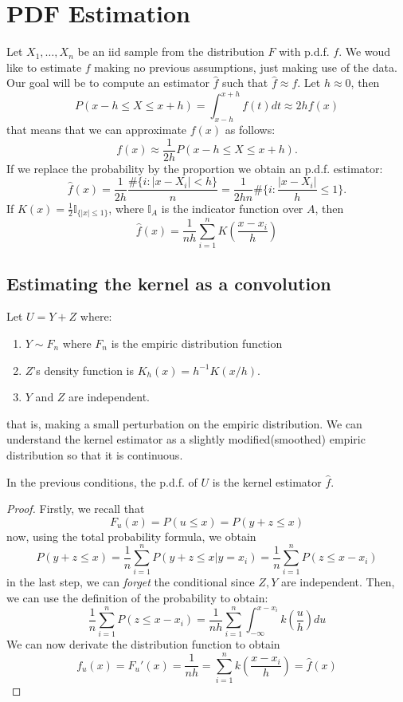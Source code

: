 

\section{ PDF Estimation}


Let $X_1,\dots,X_n$ be an iid sample from the distribution $F$ with p.d.f. $f$. We woud like to estimate $f$ making no previous assumptions, just making use of the data. Our goal will be to compute an estimator $\hat f$ such that $\hat f \approx f$. Let $h \approx 0$, then
\[
P(x-h \leq X \leq x+h) = \int_{x-h}^{x+h} f(t) dt \approx 2hf(x)
\]
that means that we can approximate $f(x)$ as follows:
\[
f(x) \approx \frac{1}{2h} P(x-h \leq X \leq x+h).
\]
If we replace the probability by the proportion we obtain an p.d.f. estimator:
\[
\hat{f}(x) = \frac{1}{2h} \frac{\#\{i : |x-X_i|< h\}}{n} = \frac{1}{2hn}\#\{i : \frac{|x-X_i|}{h} \leq 1\}.
\]
If $K(x) = \frac{1}{2} \mathbb I_{\{|x| \leq 1\}}$, where $\mathbb I_A$ is the indicator function over $A$, then
\[
\hat{f}(x) = \frac{1}{nh} \sum_{i=1}^n K\left(\frac{x-x_i}{h}\right)
\]

\subsection{ Estimating the kernel as a convolution}

Let $U = Y+Z$ where:
\begin{enumerate}
\item $Y \sim F_n$ where $F_n$ is the empiric distribution function
\item $Z$'s density function is $K_h(x) = h^{-1}K(x/h)$.
\item $Y$ and $Z$ are independent.
\end{enumerate}

that is, making a small perturbation on the empiric distribution. We can understand the kernel estimator as a slightly modified(smoothed) empiric distribution so that it is continuous.

\begin{nprop}
In the previous conditions, the p.d.f. of $U$ is the kernel estimator $\hat f$.
\end{nprop}
\begin{proof}
Firstly, we recall that
\[
F_u(x) = P(u \leq x) = P(y+z \leq x)
\]
now, using the total probability formula, we obtain
\[
P(y+z \leq x) = \frac{1}{n}\sum_{i=1}^n P(y+z \leq x | y = x_i) = \frac{1}{n}\sum_{i=1}^n P(z \leq x - x_i)
\]
in the last step, we can \emph{forget} the conditional since $Z,Y$ are independent. Then, we can use the definition of the probability to obtain:
\[
\frac{1}{n}\sum_{i=1}^n P(z \leq x - x_i) = \frac{1}{nh} \sum_{i=1}^n \int_{-\infty}^{x-x_i} k(\frac{u}{h})du
\]
We can now derivate the distribution function to obtain
\[
f_u(x) = F_u'(x) = \frac{1}{nh} = \sum_{i=1}^n k(\frac{x-x_i}{h}) = \hat{f}(x)
\]
\end{proof}

